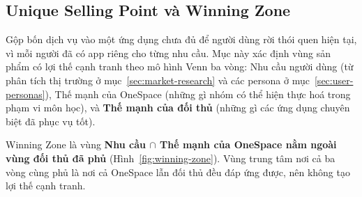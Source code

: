 \subsection{Unique Selling Point và Winning Zone}
\label{sec:usp-winning-zone}

Gộp bốn dịch vụ vào một ứng dụng chưa đủ để người dùng rời thói quen hiện tại, vì mỗi người đã có app riêng cho từng nhu cầu. Mục này xác định vùng sản phẩm có lợi thế cạnh tranh theo mô hình Venn ba vòng: Nhu cầu người dùng (từ phân tích thị trường ở mục~\ref{sec:market-research} và các persona ở mục~\ref{sec:user-personas}), Thế mạnh của OneSpace (những gì nhóm có thể hiện thực hoá trong phạm vi môn học), và \textbf{Thế mạnh của đối thủ} (những gì các ứng dụng chuyên biệt đã phục vụ tốt).

Winning Zone là vùng \textbf{Nhu cầu $\cap$ Thế mạnh của OneSpace nằm ngoài vùng đối thủ đã phủ} (Hình~\ref{fig:winning-zone}). Vùng trung tâm nơi cả ba vòng cùng phủ là nơi cả OneSpace lẫn đối thủ đều đáp ứng được, nên không tạo lợi thế cạnh tranh.


